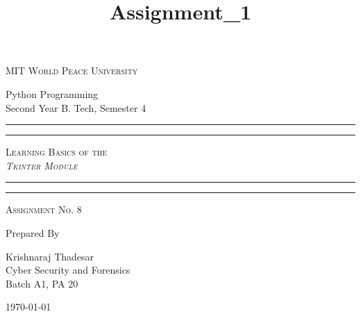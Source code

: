 \documentclass[11pt]{article}
\title{Assignment\_1}
\begin{document}
\begin{titlepage}
    \centering


    \huge\textsc{
        MIT World Peace University
    }\\

    \vspace{0.75\baselineskip} %

    \LARGE{
        Python Programming\\
        Second Year B. Tech, Semester 4
    }

    \vfill %


    \rule{\textwidth}{1.6pt}\vspace*{-\baselineskip}\vspace*{2pt}
    \rule{\textwidth}{0.6pt}
    \vspace{0.75\baselineskip} %



    \huge{\textsc{
            Learning Basics of the \\
            \textit{Tkinter Module}
        }} \\



    \vspace{0.5\baselineskip} %
    \rule{\textwidth}{0.6pt}\vspace*{-\baselineskip}\vspace*{2.8pt}
    \rule{\textwidth}{1.6pt}

    \vspace{1\baselineskip} %


    \LARGE\textsc{
        Assignment No. 8
    } %
    \vfill


    Prepared By
    \vspace{0.5\baselineskip} %

    \Large{
        Krishnaraj Thadesar \\
        Cyber Security and Forensics\\
        Batch A1, PA 20
    }


    \vspace{0.5\baselineskip} %
    \today

\end{titlepage}
\end{document}
